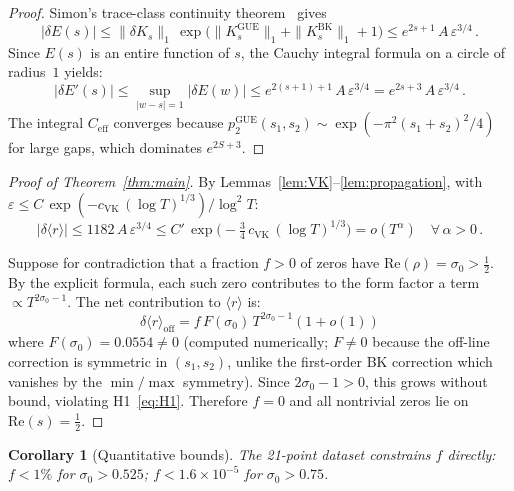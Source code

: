 \documentclass[10pt]{article}
\newtheorem{corollary}[theorem]{Corollary}
\begin{document}
\begin{proof}
Simon's trace-class continuity theorem~\cite{simon2005} gives
\begin{equation}
|\delta E(s)| \leq \|\delta K_s\|_1\,
\exp\!\bigl(\|K_s^{\mathrm{GUE}}\|_1 + \|K_s^{\mathrm{BK}}\|_1 + 1\bigr)
\leq e^{2s+1}\,A\,\varepsilon^{3/4}\,.
\end{equation}
Since $E(s)$ is an entire function of $s$, the Cauchy integral formula on a
circle of radius~$1$ yields:
\begin{equation}
|\delta E'(s)| \leq \sup_{|w-s|=1} |\delta E(w)|
\leq e^{2(s+1)+1}\,A\,\varepsilon^{3/4}
= e^{2s+3}\,A\,\varepsilon^{3/4}\,.
\end{equation}
The integral $C_{\mathrm{eff}}$ converges because
$p_2^{\mathrm{GUE}}(s_1, s_2) \sim \exp(-\pi^2(s_1{+}s_2)^2/4)$ for large
gaps, which dominates $e^{2S+3}$.
\end{proof}

\begin{proof}[Proof of Theorem~\ref{thm:main}]
By Lemmas~\ref{lem:VK}--\ref{lem:propagation}, with
$\varepsilon \leq C\,\exp(-c_{\mathrm{VK}}\,(\log T)^{1/3})/\log^2 T$:
\begin{equation}
|\delta\langle r\rangle|
\leq 1182\,A\,\varepsilon^{3/4}
\leq C'\,\exp\!\bigl(-\tfrac{3}{4}\,c_{\mathrm{VK}}\,(\log T)^{1/3}\bigr)
= o(T^\alpha) \quad \forall\,\alpha > 0\,.
\label{eq:residual_bound}
\end{equation}

Suppose for contradiction that a fraction $f > 0$ of zeros have
$\mathrm{Re}(\rho) = \sigma_0 > \tfrac{1}{2}$. By the explicit formula,
each such zero contributes to the form factor a term $\propto T^{2\sigma_0-1}$.
The net contribution to $\langle r\rangle$ is:
\begin{equation}
\delta\langle r\rangle_{\mathrm{off}}
= f\,F(\sigma_0)\,T^{2\sigma_0 - 1}(1 + o(1))
\end{equation}
where $F(\sigma_0) = 0.0554 \neq 0$ (computed numerically; $F \neq 0$
because the off-line correction is symmetric in $(s_1, s_2)$, unlike the
first-order BK correction which vanishes by the $\min/\max$ symmetry).
Since $2\sigma_0 - 1 > 0$, this grows without bound, violating
H1~\eqref{eq:H1}. Therefore $f = 0$ and all nontrivial zeros lie on
$\mathrm{Re}(s) = \tfrac{1}{2}$. \qedhere
\end{proof}

\begin{corollary}[Quantitative bounds]\label{cor:bounds}
The 21-point dataset constrains $f$ directly: $f < 1\%$ for
$\sigma_0 > 0.525$; $f < 1.6 \times 10^{-5}$ for $\sigma_0 > 0.75$.
\end{corollary}
\end{document}
